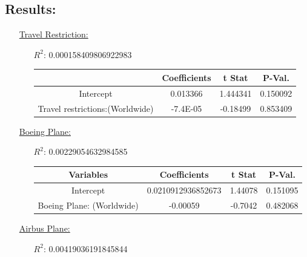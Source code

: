 \documentclass[12pt]{report}
\begin{document}
\subsection*{Results:}
\begin{enumerate}
    \item[\underline{Travel Restriction:}]
        \begin{enumerate}
            \item[$R^2$:] 0.000158409806922983
            \item[]
                \begin{tabular}{|c|c|c|c|}
                    \toprule \hline
                    \textbf{} & \textbf{Coefficients}  & \textbf{t Stat}&\textbf{P-Val.} \\ \hline

                    Intercept & 0.013366 &  1.444341 & 0.150092\\ \hline
                    Travel restrictions:(Worldwide) & -7.4E-05 &  -0.18499 &0.853409 \\ \hline
                    \bottomrule
                \end{tabular}





        \end{enumerate}
    \item[\underline{Boeing Plane:}]
        \begin{enumerate}
            \item[$R^2$:]0.00229054632984585
            \item[]

                \begin{tabular}{|c|c|c|c|}
                    \toprule \hline
                    \textbf{Variables} & \textbf{Coefficients}  & \textbf{t Stat}&\textbf{P-Val.} \\ \hline
                    Intercept &0.0210912936852673 &  1.44078 &0.151095 \\ \hline
                    Boeing Plane: (Worldwide) & -0.00059  & -0.7042 &0.482068 \\ \hline
                    \bottomrule
                \end{tabular}




        \end{enumerate}
    \item[\underline{Airbus Plane:}]
        \begin{enumerate}
            \item[$R^2$:]0.00419036191845844
            \item[]


\end{enumerate}
\end{enumerate}
\end{document}
